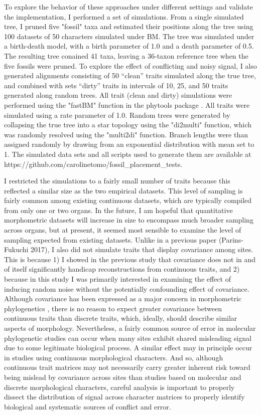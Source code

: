 \documentclass[12pt]{article}
\begin{document}
To explore the behavior of these approaches under different settings and 
validate the implementation, I performed a set of simulations. From a
single simulated tree, I pruned five "fossil" taxa and
estimated their positions along the tree using 100 datasets of 50
characters simulated under BM. The tree was simulated under a
birth-death model, with a birth parameter of 1.0 and a death parameter
of 0.5. The resulting tree conained 41 taxa,
leaving a 36-taxon reference tree when the five fossils were pruned. To
explore the effect of conflicting and noisy signal, I also generated
alignments consisting of 50 ``clean'' traits simulated along the true
tree, and combined with sets ``dirty'' traits in intervals of
10, 25, and 50 traits generated along random trees. All trait (clean and dirty) simulations were
performed using the "fastBM" function in the phytools package \citep{revell2012phytools}. 
All traits were simulated using a rate parameter of 1.0. Random trees
were generated by collapsing the true tree into a star topology using
the "di2multi" function, which was randomly resolved using the "multi2di" function.
Branch lengths were than assigned randomly by drawing from an exponential
distribution with mean set to 1. The simulated data sets and all scripts used
to generate them are available at https://github.com/carolinetomo/fossil\_placement\_tests. 

I restricted the simulations to a fairly small number of traits because
this reflected a similar size as the two empirical datasets.
This level of sampling is fairly common among existing continuous
datasets, which are typically compiled from only one or two organs. In
the future, I am hopeful that quantitative morphometric datasets will
increase in size to encompass much broader sampling across organs, but
at present, it seemed most sensible to examine the level of sampling
expected from existing datasets. Unlike in a previous paper
(Parins-Fukuchi 2017), I also did not simulate traits that display
covariance among sites. This is because 1) I showed in the previous study
that covariance does not in and of itself significantly handicap reconstructions from
continuous traits, and 2) because in this study I was primarily
interested in examining the effect of inducing random noise without the
potentially confounding effect of covariance. Although covariance has
been expressed as a major concern in morphometric phylogenetics
\citep{felsenstein1988phylogenies,felsenstein2002quantitative}, there is no reason to expect greater
covariance between continuous traits than discrete traits, which,
ideally, should describe similar aspects of morphology. Nevertheless, a fairly
common source of error  in molecular phylogenetic studies can occur when many sites 
exhibit shared misleading signal due to some legitimate biological process.
A similar effect may in principle occur in studies using continuous morphological characters.
And so, although continuous trait matrices may not necessarily carry greater inherent risk
toward being mislead by covariance across sites than studies based on molecular and discrete morphological characters, 
careful analysis is important to properly dissect the distribution of signal across character matrices
to properly identify biological and systematic sources of conflict and error.
\end{document}
